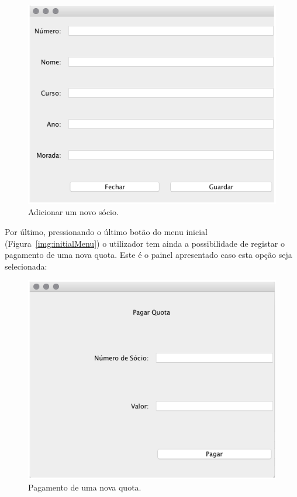 \documentclass[a4paper]{article}
\begin{document}
\begin{figure}[H]
\centering
\includegraphics[scale=0.35]{imgs/novoSocio.png}
\caption{Adicionar um novo sócio.}
\label{img:novoSocio}
\end{figure}


Por último, pressionando o último botão do menu inicial (Figura~\ref{img:initialMenu}) o utilizador tem ainda a possibilidade de registar o pagamento de uma nova quota. Este é o painel apresentado caso esta opção seja selecionada:

\begin{figure}[H]
\centering
\includegraphics[scale=0.35]{imgs/pagarQuota.png}
\caption{Pagamento de uma nova quota.}
\label{img:pagarQuota}
\end{figure}
\end{document}
